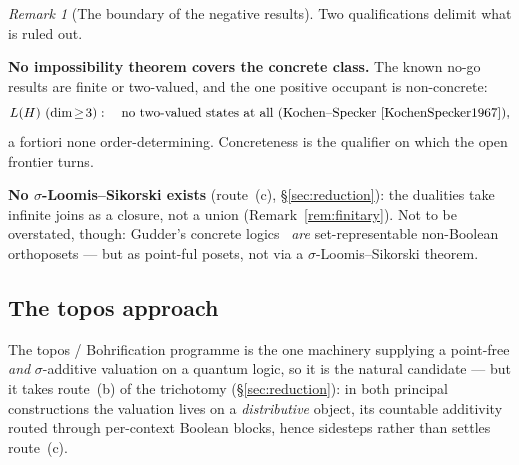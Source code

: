 \documentclass[11pt,reqno]{amsart}
\theoremstyle{plain}
\theoremstyle{definition}
\theoremstyle{remark}
\newtheorem{remark}[theorem]{Remark}
\begin{document}
\begin{remark}[The boundary of the negative results]\label{rem:miss}
Two qualifications delimit what is ruled out.
\begin{description}[style=nextline, font=\normalfont\bfseries,
    labelwidth=1.2cm, leftmargin=1.5cm, topsep=2pt]
  \item[(i)] \textbf{No impossibility theorem covers the concrete class.} The
    known no-go results are finite or two-valued, and the one positive
    occupant is non-concrete:
    \[
      L(H)\ (\dim\!\geq\!3):\quad
      \text{no two-valued states at all (Kochen--Specker~\cite{KochenSpecker1967})},
    \]
    a fortiori none order-determining. Concreteness is the qualifier on which
    the open frontier turns.
  \item[(ii)] \textbf{No $\sigma$-Loomis--Sikorski exists} (route~(c),
    \S\ref{sec:reduction}): the dualities take infinite joins as a closure, not a
    union (Remark~\ref{rem:finitary}). Not to be overstated, though: Gudder's
    concrete logics~\cite{Gudder1979} \emph{are} set-representable non-Boolean
    orthoposets --- but as point-ful posets, not via a $\sigma$-Loomis--Sikorski
    theorem.
\end{description}
\end{remark}

\subsection{The topos approach}
\label{sec:topos}
The topos / Bohrification programme is the one machinery supplying a point-free
\emph{and} $\sigma$-additive valuation on a quantum logic, so it is the natural
candidate --- but it takes route~(b) of the trichotomy (\S\ref{sec:reduction}): in
both principal constructions the valuation lives on a \emph{distributive} object,
its countable additivity routed through per-context Boolean blocks, hence sidesteps
rather than settles route~(c).
\end{document}
